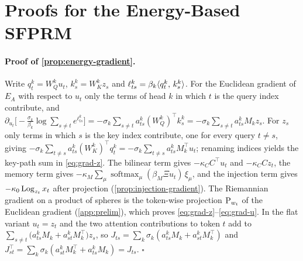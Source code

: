 \section{Proofs for the Energy-Based SFPRM}
\label{app:energy-proofs}

\paragraph{Proof of \cref{prop:energy-gradient}.}
Write $q^k_t=W_Q^ku_t$, $k^k_s=W_K^kz_s$ and $\ell^k_{ts}=\beta_k\langle q^k_t,\, k^k_s\rangle$. For the Euclidean
gradient of $E_A$ with respect to $u_t$ only the terms of head $k$ in which $t$ is the query index
contribute, and $\partial_{u_t}\big[-\tfrac{\sigma_k}{\beta_k}\log\sum_{s\neq t}e^{\ell^k_{ts}}\big]
=-\sigma_k\sum_{s\neq t}a^k_{ts}(W_Q^k)^\top k^k_s=-\sigma_k\sum_{s\neq t}a^k_{ts}M_kz_s$. For $z_s$
only terms in which $s$ is the key index contribute, one for every query $t\neq s$, giving
$-\sigma_k\sum_{t\neq s}a^k_{ts}(W_K^k)^\top q^k_t=-\sigma_k\sum_{t\neq s}a^k_{ts}M_k^\top u_t$;
renaming indices yields the key-path sum in \eqref{eq:grad-z}. The bilinear term gives
$-\kappa_CC^\top u_t$ and $-\kappa_CCz_t$, the memory term gives
$-\kappa_M\sum_\mu\operatorname{softmax}_\mu(\beta_M\Xi u_t)\,\xi_\mu$, and the injection term gives
$-\kappa_0\operatorname{Log}_{z_t}x_t$ after projection (\cref{prop:injection-gradient}). The Riemannian gradient
on a product of spheres is the token-wise projection $\operatorname{P}_{w_t}$ of the Euclidean gradient
(\cref{app:prelim}), which proves \eqref{eq:grad-z}--\eqref{eq:grad-u}. In the flat variant
$u_t=z_t$ and the two attention contributions to token $t$ add to
$\sum_{s\neq t}\big(a^k_{ts}M_k+a^k_{st}M_k^\top\big)z_s$, so $J_{ts}=\sum_k\sigma_k(a^k_{ts}M_k+a^k_{st}M_k^\top)$
and $J_{st}^\top=\sum_k\sigma_k(a^k_{st}M_k^\top+a^k_{ts}M_k)=J_{ts}$. \hfill$\square$

